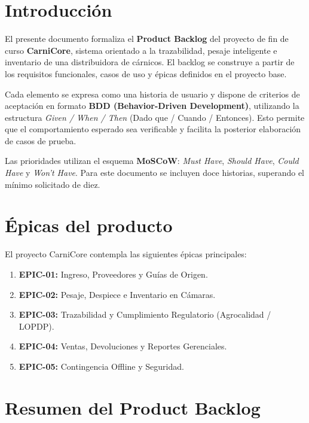 \documentclass[11pt,a4paper]{article}
\begin{document}
\section{Introducción}
El presente documento formaliza el \textbf{Product Backlog} del proyecto de fin de curso
\textbf{CarniCore}, sistema orientado a la trazabilidad, pesaje inteligente e inventario de
una distribuidora de cárnicos. El backlog se construye a partir de los requisitos funcionales,
casos de uso y épicas definidos en el proyecto base.

Cada elemento se expresa como una historia de usuario y dispone de criterios de aceptación
en formato \textbf{BDD (Behavior-Driven Development)}, utilizando la estructura
\textit{Given / When / Then} (Dado que / Cuando / Entonces). Esto permite que el comportamiento
esperado sea verificable y facilita la posterior elaboración de casos de prueba.

Las prioridades utilizan el esquema \textbf{MoSCoW}: \textit{Must Have}, \textit{Should Have},
\textit{Could Have} y \textit{Won't Have}. Para este documento se incluyen doce historias,
superando el mínimo solicitado de diez.

\section{Épicas del producto}
El proyecto CarniCore contempla las siguientes épicas principales:

\begin{enumerate}[leftmargin=1.1cm]
\item \textbf{EPIC-01:} Ingreso, Proveedores y Guías de Origen.
\item \textbf{EPIC-02:} Pesaje, Despiece e Inventario en Cámaras.
\item \textbf{EPIC-03:} Trazabilidad y Cumplimiento Regulatorio (Agrocalidad / LOPDP).
\item \textbf{EPIC-04:} Ventas, Devoluciones y Reportes Gerenciales.
\item \textbf{EPIC-05:} Contingencia Offline y Seguridad.
\end{enumerate}

\section{Resumen del Product Backlog}
\end{document}
